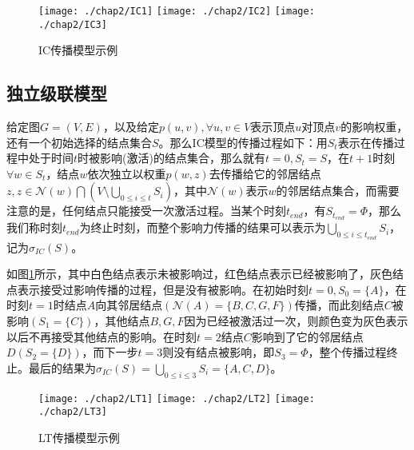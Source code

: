 \begin{figure}[H]
\centering%
	{\texttt{[image: ./chap2/IC1]}}
	\hspace{1mm}%
	{\texttt{[image: ./chap2/IC2]}}
	\hspace{1mm}%
	{\texttt{[image: ./chap2/IC3]}}
	\caption{IC传播模型示例}
	\label{fig:IC-inf-diffusion}
\end{figure}


\subsection{独立级联模型}
\label{sec:IC-model-desc}
给定图$G=(V, E)$，以及给定$p(u, v), \forall u, v \in V$表示顶点$u$对顶点$v$的影响权重，还有一个初始选择的结点集合$S$。那么IC模型的传播过程如下：用$S_{t}$表示在传播过程中处于时间$t$时被影响(激活)的结点集合，那么就有$t=0, S_{t}=S$，在$t+1$时刻$\forall w \in S_{t}$，结点$w$依次独立以权重$p(w, z)$去传播给它的邻居结点$z, z \in \mathcal{N}(w) \bigcap (V \setminus \bigcup_{0 \leq i \leq t}S_{i})$，其中$\mathcal{N}(w)$表示$w$的邻居结点集合，而需要注意的是，任何结点只能接受一次激活过程。当某个时刻$t_{end}$，有$S_{t_{end}} = \Phi$，那么我们称时刻$t_{end}$为终止时刻，而整个影响力传播的结果可以表示为$\bigcup_{0 \leq i \leq t_{end}}S_{i}$，记为$\sigma_{IC}(S)$。


如图\ref{fig:IC-inf-diffusion}所示，其中白色结点表示未被影响过，红色结点表示已经被影响了，灰色结点表示接受过影响传播的过程，但是没有被影响。在初始时刻$t=0,S_{0}=\{A\}$，在时刻$t=1$时结点$A$向其邻居结点$(\mathcal{N}(A)=\{B, C, G, F\})$传播，而此刻结点$C$被影响$(S_{1}=\{C\})$，其他结点$B, G, F$因为已经被激活过一次，则颜色变为灰色表示以后不再接受其他结点的影响。在时刻$t=2$结点$C$影响到了它的邻居结点$D(S_{2}=\{D\})$，而下一步$t=3$则没有结点被影响，即$S_{3}=\Phi$，整个传播过程终止。最后的结果为$\sigma_{IC}(S)=\bigcup_{0 \leq i \leq 3}S_{i}=\{A, C, D\}$。


\begin{figure}[H]
\centering%
	{\texttt{[image: ./chap2/LT1]}}
	\hspace{1mm}%
	{\texttt{[image: ./chap2/LT2]}}
	\hspace{1mm}%
	{\texttt{[image: ./chap2/LT3]}}
	\caption{LT传播模型示例}
	\label{fig:LT-inf-diffusion}
\end{figure}


